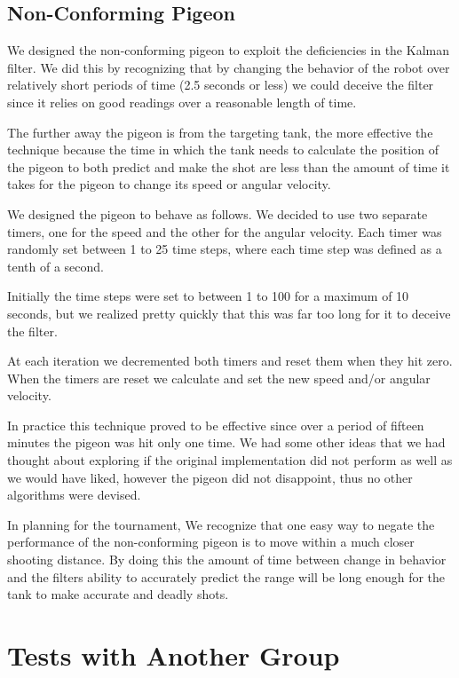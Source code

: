 \subsection{Non-Conforming Pigeon}
We designed the non-conforming pigeon to exploit the deficiencies in the Kalman filter.  We did this by recognizing that by changing the behavior of the robot over relatively short periods of time (2.5 seconds or less) we could deceive the filter since it relies on good readings over a reasonable length of time.
\par
The further away the pigeon is from the targeting tank, the more effective the technique because the time in which the tank needs to calculate the position of the pigeon to both predict and make the shot are less than the amount of time it takes for the pigeon to change its speed or angular velocity.
\par
We designed the pigeon to behave as follows.  We decided to use two separate timers, one for the speed and the other for the angular velocity.  Each timer was randomly set between 1 to 25 time steps, where each time step was defined as a tenth of a second.
\par
Initially the time steps were set to between 1 to 100 for a maximum of 10 seconds, but we realized pretty quickly that this was far too long for it to deceive the filter.
\par
At each iteration we decremented both timers and reset them when they hit zero.  When the timers are reset we calculate and set the new speed and/or angular velocity.
\par
In practice this technique proved to be effective since over a period of fifteen minutes the pigeon was hit only one time.  We had some other ideas that we had thought about exploring if the original implementation did not perform as well as we would have liked, however the pigeon did not disappoint, thus no other algorithms were devised.
\par
In planning for the tournament, We recognize that one easy way to negate the performance of the non-conforming pigeon is to move within a much closer shooting distance.  By doing this the amount of time between change in behavior and the filters ability to accurately predict the range will be long enough for the tank to make accurate and deadly shots.
\section{Tests with Another Group}
